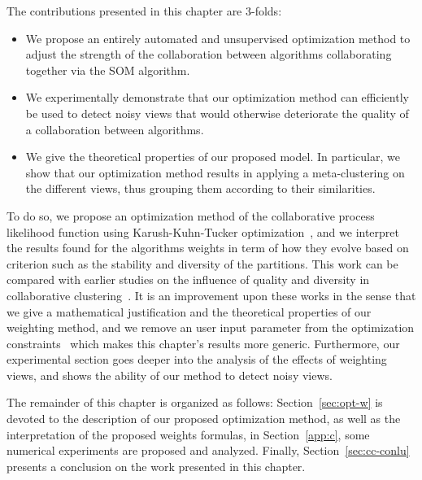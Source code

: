 


The contributions presented in this chapter are 3-folds:
\begin{itemize}
	\item We propose an entirely automated and unsupervised optimization method to adjust the strength of the collaboration between algorithms collaborating together via the SOM algorithm.
	\item We experimentally demonstrate that our optimization method can efficiently be used to detect noisy views that would otherwise deteriorate the quality of a collaboration between algorithms.
	\item We give the theoretical properties of our proposed model. In particular, we show that our optimization method results in applying a meta-clustering on the different views, thus grouping them according to their similarities. 
\end{itemize} 
To do so, we propose an optimization method of the collaborative process likelihood function using Karush-Kuhn-Tucker optimization~\cite{KKT1}, and we interpret the results found for the algorithms weights in term of how they evolve based on criterion such as the stability and diversity of the partitions. This work can be compared with earlier studies on the influence of quality and diversity in collaborative clustering~\cite{grozavu2011learning,DBLP:conf/ssci/RastinCGB15,DBLP:conf/ijcnn/GrozavuCB14,Sublime2017}. It is an improvement upon these works in the sense that we give a mathematical justification and the theoretical properties of our weighting method, and we remove an user input parameter from the optimization constraints~\cite{Sublime2017} which makes this chapter's results more generic. Furthermore, our experimental section goes deeper into the analysis of the effects of weighting views, and shows the ability of our method to detect noisy views.


The remainder of this chapter is organized as follows: Section~\ref{sec:opt-w} is devoted to the description of our proposed optimization method, as well as the interpretation of the proposed weights formulas, in Section~\ref{app:c}, some numerical experiments are proposed and analyzed. Finally, Section~\ref{sec:cc-conlu} presents a conclusion on the work presented in this chapter.


